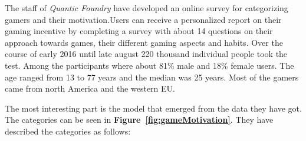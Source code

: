 The staff of \textit{Quantic Foundry} have developed an online survey for categorizing 
gamers and their motivation.\footnotemark[6] Users can receive a personalized report on their gaming incentive by completing a survey with about 14 questions on their approach towards games, their different gaming aspects and habits. \newline
Over the course of early 2016 until late august 220 thousand individual people took the test. Among the participants where about 81\% male and 18\% female users. The age ranged from 13 to 77 years and the median was 25 years. Most of the gamers came from north America and the western EU.

The most interesting part is the model that emerged from the data they have got. The categories can be seen in \textbf{Figure~\ref{fig:gameMotivation}}. They have described the categories as follows:

